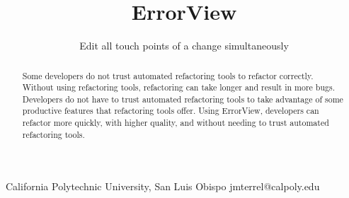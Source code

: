 \documentclass{sigplanconf}
\begin{document}
\setlength{\pdfpageheight}{\paperheight}
\setlength{\pdfpagewidth}{\paperwidth}




\permissiontopublish             %

\newcommand{\pname}{ErrorView}

\title{\pname{}}
\subtitle{Edit all touch points of a change simultaneously}

           {California Polytechnic University, San Luis Obispo}
           {jmterrel@calpoly.edu}

\maketitle

\begin{abstract}
Some developers do not trust automated refactoring tools to refactor correctly.
Without using refactoring tools, refactoring can take longer and result
in more bugs. Developers do not have to trust automated refactoring tools to
take advantage of some productive features that refactoring tools offer.
Using \pname{}, developers can refactor more quickly, with higher
quality, and without needing to trust automated refactoring tools.
\end{abstract}


\end{document}
